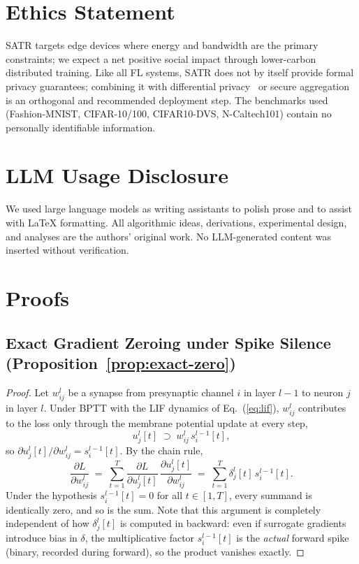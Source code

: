 \documentclass{article} %
\newcommand{\method}{SATR\xspace}
\begin{document}
\section*{Ethics Statement}
\method targets edge devices where energy and bandwidth are the primary constraints; we expect a net positive social impact through lower-carbon distributed training. Like all FL systems, \method does not by itself provide formal privacy guarantees; combining it with differential privacy~\citep{dwork2014dp} or secure aggregation~\citep{bonawitz2017secagg} is an orthogonal and recommended deployment step. The benchmarks used (Fashion-MNIST, CIFAR-10/100, CIFAR10-DVS, N-Caltech101) contain no personally identifiable information.

\section*{LLM Usage Disclosure}
We used large language models as writing assistants to polish prose and to assist with LaTeX formatting. All algorithmic ideas, derivations, experimental design, and analyses are the authors' original work. No LLM-generated content was inserted without verification.




\appendix
\section{Proofs}
\label{app:proofs}

\subsection{Exact Gradient Zeroing under Spike Silence (Proposition~\ref{prop:exact-zero})}
\label{app:proof-exact-zero}
\begin{proof}
Let $w_{ij}^l$ be a synapse from presynaptic channel $i$ in layer $l-1$ to neuron $j$ in layer $l$. Under BPTT with the LIF dynamics of Eq.~(\ref{eq:lif}), $w_{ij}^l$ contributes to the loss only through the membrane potential update at every step,
\[
u_j^l[t] \;\supset\; w_{ij}^l \, s_i^{l-1}[t],
\]
so $\partial u_j^l[t] / \partial w_{ij}^l = s_i^{l-1}[t]$. By the chain rule,
\[
\frac{\partial L}{\partial w_{ij}^l} \;=\; \sum_{t=1}^{T} \frac{\partial L}{\partial u_j^l[t]}\,\frac{\partial u_j^l[t]}{\partial w_{ij}^l} \;=\; \sum_{t=1}^{T} \delta_j^l[t]\, s_i^{l-1}[t].
\]
Under the hypothesis $s_i^{l-1}[t]=0$ for all $t\in[1,T]$, every summand is identically zero, and so is the sum. Note that this argument is completely independent of how $\delta_j^l[t]$ is computed in backward: even if surrogate gradients introduce bias in $\delta$, the multiplicative factor $s_i^{l-1}[t]$ is the \emph{actual} forward spike (binary, recorded during forward), so the product vanishes exactly.
\end{proof}
\end{document}
